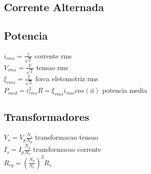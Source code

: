 \subsection{Corrente Alternada}
\subsection{Potencia}
$i_{rms}=\frac{i}{\sqrt{2}}$ corrente rms\\
$V_{rms}=\frac{V}{\sqrt{2}}$ tensao rms\\
$\xi _{rms}=\frac{\xi }{\sqrt{2}}$ forca eletomotriz rms\\
$P_{med}=i^2_{rms}R=\xi _{rms}i_{rms}cos\left(\phi \right)$ potencia media\\
\subsection{Transformadores}
$V_s=V_p\frac{N_s}{N_p}$ transformacao tensao\\
$I_s=I_p\frac{N_p}{N_s}$ transformacao corrente\\
$R_{eq}=\left(\frac{N_p}{N_s}\right)^2R_s$\\

